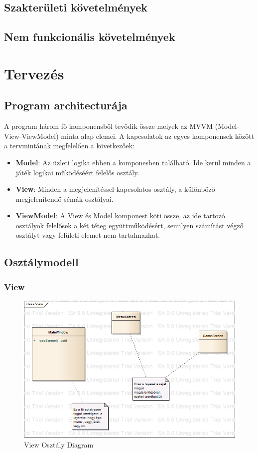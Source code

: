 \documentclass[a4paper,12pt]{report}
\begin{document}
\section{Szakterületi követelmények}

\section{Nem funkcionális követelmények}

\chapter{Tervezés}

\section{Program architecturája}

A program három fő komponensből tevődik össze melyek az MVVM (Model-View-ViewModel) minta alap elemei. A kapcsolatok az egyes komponensek között a tervmintának megfelelően a következőek:
\begin{itemize}
\item {\bf Model}: Az üzleti logika ebben a komponesben található. Ide kerül minden a játék logikai működéséért felelős osztály.
\item {\bf View}: Minden a megjelenítéssel kapcsolatos osztály, a különböző megjelenítendő sémák osztályai.
\item {\bf ViewModel}: A View és Model komponest köti össze, az ide tartozó osztályok felelősek a két téteg együttműködésért, semilyen számítást végző osztályt vagy felületi elemet nem tartalmazhat.
\end{itemize}
 
\section{Osztálymodell}

\subsection{View}

\begin{figure}[hbtp]
\centering
\includegraphics[width=1\textwidth]{ViewClass.png}
\caption{View Osztály Diagram}
\label{fig:vc}
\end{figure}
\end{document}
